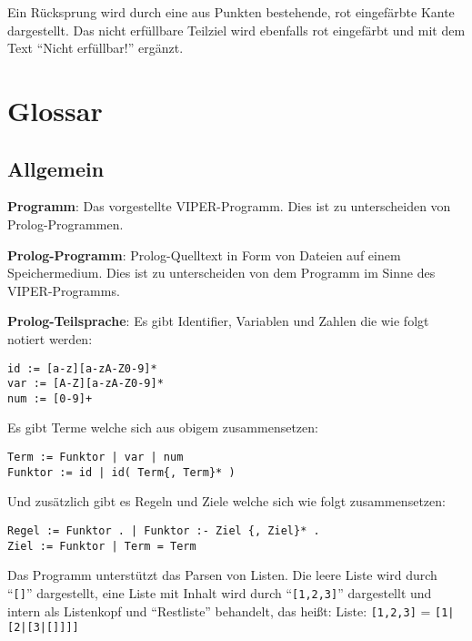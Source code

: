 \documentclass[parskip=full,11pt,twoside]{scrartcl}
\begin{document}
\begin{minipage}{\linewidth}
\end{minipage}

Ein Rücksprung wird durch eine aus Punkten bestehende, rot eingefärbte Kante dargestellt.
Das nicht erfüllbare Teilziel wird ebenfalls rot eingefärbt und mit dem Text \enquote{Nicht erfüllbar!} ergänzt.

\section{Glossar}

\subsection{Allgemein}

\textbf{Programm}:
Das vorgestellte VIPER-Programm. Dies ist zu unterscheiden von Prolog-Programmen.

\textbf{Prolog-Programm}:
Prolog-Quelltext in Form von Dateien auf einem Speichermedium. Dies ist zu unterscheiden von dem Programm im Sinne des VIPER-Programms.

\textbf{Prolog-Teilsprache}:
Es gibt Identifier, Variablen und Zahlen die wie folgt notiert werden:

\begin{lstlisting}
id := [a-z][a-zA-Z0-9]*
var := [A-Z][a-zA-Z0-9]*
num := [0-9]+
\end{lstlisting}

Es gibt Terme welche sich aus obigem zusammensetzen:

\begin{lstlisting}
Term := Funktor | var | num
Funktor := id | id( Term{, Term}* )
\end{lstlisting}

Und zusätzlich gibt es Regeln und Ziele welche sich wie folgt zusammensetzen:

\begin{lstlisting}
Regel := Funktor . | Funktor :- Ziel {, Ziel}* .
Ziel := Funktor | Term = Term
\end{lstlisting}

Das Programm unterstützt das Parsen von Listen. Die leere Liste wird durch \enquote{\texttt{[]}} dargestellt, eine Liste mit Inhalt wird durch \enquote{\texttt{[1,2,3]}} dargestellt und intern als Listenkopf und \enquote{Restliste} behandelt, das heißt:\newline
Liste: \texttt{[1,2,3]} = \texttt{[1|[2|[3|[]]]]}
\end{document}
